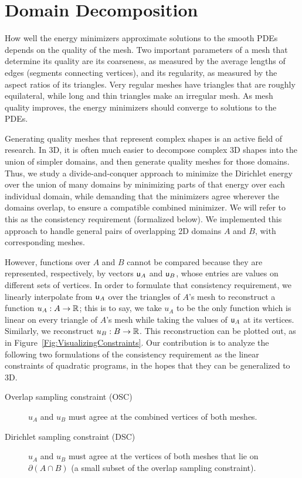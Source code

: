 \documentclass[11pt,a4paper, final, twoside]{article}
\theoremstyle{proposition}
\theoremstyle{definition}
\theoremstyle{remark}
\numberwithin{equation}{section}
\begin{document}


\newpage
\section{Domain Decomposition}

How well the energy minimizers approximate solutions to the smooth PDEs depends on the quality of the mesh. Two important parameters of a mesh that determine its quality are its coarseness, as measured by the average lengths of edges (segments connecting vertices), and its regularity, as measured by the aspect ratios of its triangles. Very regular meshes have triangles that are roughly equilateral, while long and thin triangles make an irregular mesh. As mesh quality improves, the energy minimizers should converge to solutions to the PDEs.

Generating quality meshes that represent complex shapes is an active field of research. In 3D, it is often much easier to decompose complex 3D shapes into the union of simpler domains, and then generate quality meshes for those domains. Thus, we study a divide-and-conquer approach to minimize the Dirichlet energy over the union of many domains by minimizing parts of that energy over each individual domain, while demanding that the minimizers agree wherever the domains overlap, to ensure a compatible combined minimizer. We will refer to this as the consistency requirement (formalized below). We implemented this approach to handle general pairs of overlapping 2D domains $A$ and $B$, with corresponding meshes.

However, functions over $A$ and $B$ cannot be compared because they are represented, respectively, by vectors $\mathsf{u}_A$ and $\mathsf{u}_B$, whose entries are values on different sets of vertices. In order to formulate that consistency requirement, we linearly interpolate from $\mathsf{u}_A$ over the triangles of $A$'s mesh to reconstruct a function $u_A : A \to \mathbb{R}$; this is to say, we take $u_A$ to be the only function which is linear on every triangle of $A$'s mesh while taking the values of $\mathsf{u}_A$ at its vertices.
Similarly, we reconstruct $u_B : B \to \mathbb{R}$. This reconstruction can be plotted out, as in Figure~\ref{Fig:VisualizingConstraints}. Our contribution is to analyze the following two formulations of the consistency requirement as the linear constraints of quadratic programs, in the hopes that they can be generalized to 3D.
\begin{description}
  \item[Overlap sampling constraint (OSC)] $u_A$ and $u_B$ must agree at the combined vertices of both meshes.
  \item[Dirichlet sampling constraint (DSC)] $u_A$ and $u_B$ must agree at the vertices of both meshes that lie on $\partial(A \cap B)$ (a small subset of the overlap sampling constraint).
\end{description}
\end{document}
